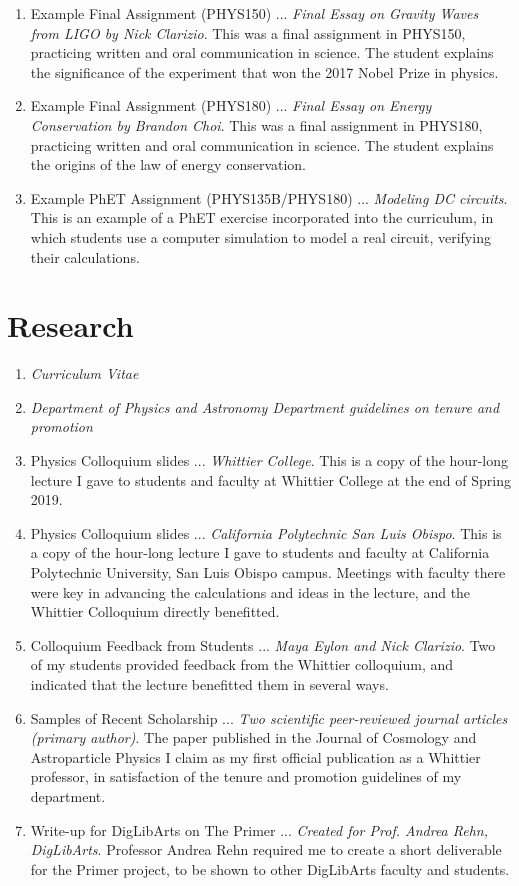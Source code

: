 \documentclass[../../main.tex]{subfiles}
\begin{document}
\begin{enumerate}
\item Example Final Assignment (PHYS150) ... \textit{Final Essay on Gravity Waves from LIGO by Nick Clarizio}.  This was a final assignment in PHYS150, practicing written and oral communication in science.  The student explains the significance of the experiment that won the 2017 Nobel Prize in physics.
\item Example Final Assignment (PHYS180) ... \textit{Final Essay on Energy Conservation by Brandon Choi}.  This was a final assignment in PHYS180, practicing written and oral communication in science.  The student explains the origins of the law of energy conservation.
\item Example PhET Assignment (PHYS135B/PHYS180) ... \textit{Modeling DC circuits}.  This is an example of a PhET exercise incorporated into the curriculum, in which students use a computer simulation to model a real circuit, verifying their calculations.
\end{enumerate}

\section{Research}

\begin{enumerate}
\item \textit{Curriculum Vitae}
\item \textit{Department of Physics and Astronomy Department guidelines on tenure and promotion}
\item Physics Colloquium slides ... \textit{Whittier College}.  This is a copy of the hour-long lecture I gave to students and faculty at Whittier College at the end of Spring 2019.
\item Physics Colloquium slides ... \textit{California Polytechnic San Luis Obispo}.  This is a copy of the hour-long lecture I gave to students and faculty at California Polytechnic University, San Luis Obispo campus.  Meetings with faculty there were key in advancing the calculations and ideas in the lecture, and the Whittier Colloquium directly benefitted.
\item Colloquium Feedback from Students ... \textit{Maya Eylon and Nick Clarizio}.  Two of my students provided feedback from the Whittier colloquium, and indicated that the lecture benefitted them in several ways.
\item Samples of Recent Scholarship ... \textit{Two scientific peer-reviewed journal articles (primary author)}.  The paper published in the Journal of Cosmology and Astroparticle Physics I claim as my first official publication as a Whittier professor, in satisfaction of the tenure and promotion guidelines of my department.
\item Write-up for DigLibArts on The Primer ... \textit{Created for Prof. Andrea Rehn, DigLibArts}.  Professor Andrea Rehn required me to create a short deliverable for the Primer project, to be shown to other DigLibArts faculty and students.
\end{enumerate}
\end{document}
